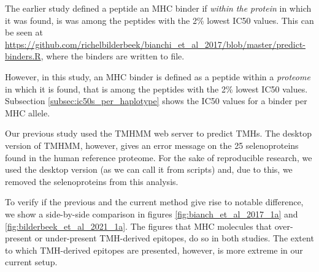 
The earlier study defined a peptide an MHC binder 
if \emph{within the protein} in which it was found, 
is was among the peptides with the 2\% lowest IC50 values.
This can be seen at \url{https://github.com/richelbilderbeek/bianchi_et_al_2017/blob/master/predict-binders.R},
where the binders are written to file.

However, in this study, an MHC binder is defined as a peptide within a \emph{proteome} in which it is found, that is among the peptides with the 2\% lowest IC50 values.
Subsection \ref{subsec:ic50s_per_haplotype} shows the IC50 values
for a binder per MHC allele. 


Our previous study used the TMHMM web server
to predict TMHs.
The desktop version of TMHMM, however, gives an
error message on the 25 selenoproteins found in the human
reference proteome.
For the sake of reproducible research, we used the desktop version (as
we can call it from scripts) and, due to this, we removed the
selenoproteins from this analysis.


To verify if the previous and the current method give rise to
notable difference, we show a side-by-side comparison
in figures \ref{fig:bianch_et_al_2017_1a} and \ref{fig:bilderbeek_et_al_2021_1a}.
The figures that MHC molecules that over-present or under-present TMH-derived epitopes,
do so in both studies. The extent to which TMH-derived epitopes are
presented, however, is more extreme in our current setup.

